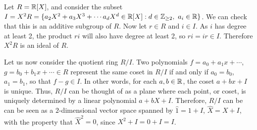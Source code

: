 \begin{example}
  Let $R=\mathbb R[X]$, and consider the subset $I=X^2 R=\{a_2X^2+a_3X^3+\cdots a_dX^d\in \mathbb R[X]: d\in \mathbb Z_{\geq 2},\text{ } a_i\in \mathbb R\}$. We can check that this is an additive subgroup of $R.$ Now let $r\in R$ and $i\in I$. As $i$ has degree at least 2, the product $ri$ will also have degree at least 2, so $ri=ir \in I.$ Therefore $X^2R$ is an ideal of $R.$ 

  Let us now consider the quotient ring $R/I$. Two polynomials $f=a_0+a_1x+\cdots$, $g=b_0+b_1x+\cdots \in R$ represent the same coset in $R/I$ if and only if $a_0=b_0$, $a_1=b_1$, so that $f-g\in I$. In other words, for each $a,b\in \mathbb R$, the coset $a+bx+I$ is unique. Thus, $R/I$ can be thought of as a plane where each point, or coset, is uniquely determined by a linear polynomial $a+bX+I.$  Therefore, $R/I$ can be can be seen as a $2$-dimensional
  vector space spanned by $\hat{1}=1+I$, $\hat{X}=X+I$, with the property that $\hat{X}^2=0$, since
  $X^2+I=0+I=I$.
\end{example}
